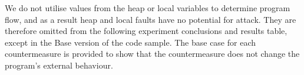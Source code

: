 \noindent We do not utilise values from the heap or local variables to determine program flow, and as a result heap and local faults have no potential for attack. They are therefore omitted from the following experiment conclusions and results table, except in the Base version of the code sample. The base case for each countermeasure is provided to show that the countermeasure does not change the program's external behaviour.